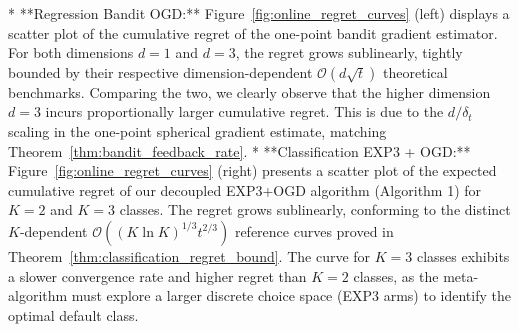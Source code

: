 * **Regression Bandit OGD:** Figure~\ref{fig:online_regret_curves} (left) displays a scatter plot of the cumulative regret of the one-point bandit gradient estimator. For both dimensions $d=1$ and $d=3$, the regret grows sublinearly, tightly bounded by their respective dimension-dependent $\mathcal{O}(d\sqrt{t})$ theoretical benchmarks. Comparing the two, we clearly observe that the higher dimension $d=3$ incurs proportionally larger cumulative regret. This is due to the $d/\delta_t$ scaling in the one-point spherical gradient estimate, matching Theorem~\ref{thm:bandit_feedback_rate}.
* **Classification EXP3 + OGD:** Figure~\ref{fig:online_regret_curves} (right) presents a scatter plot of the expected cumulative regret of our decoupled EXP3+OGD algorithm (Algorithm 1) for $K=2$ and $K=3$ classes. The regret grows sublinearly, conforming to the distinct $K$-dependent $\mathcal{O}((K \ln K)^{1/3} t^{2/3})$ reference curves proved in Theorem~\ref{thm:classification_regret_bound}. The curve for $K=3$ classes exhibits a slower convergence rate and higher regret than $K=2$ classes, as the meta-algorithm must explore a larger discrete choice space (EXP3 arms) to identify the optimal default class.
